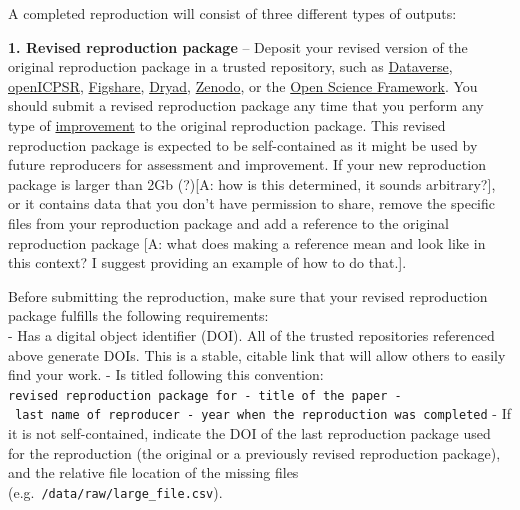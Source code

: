 \documentclass[
]{book}
\begin{document}
A completed reproduction will consist of three different types of outputs:

\textbf{1. Revised reproduction package} -- Deposit your revised version of the original reproduction package in a trusted repository, such as \href{https://dataverse.org/}{Dataverse}, \href{https://www.openicpsr.org/openicpsr/}{openICPSR}, \href{https://figshare.com}{Figshare}, \href{https://datadryad.org/stash}{Dryad}, \href{https://about.zenodo.org/}{Zenodo}, or the \href{osf.io/}{Open Science Framework}. You should submit a revised reproduction package any time that you perform any type of \protect\hyperlink{improvements}{improvement} to the original reproduction package. This revised reproduction package is expected to be self-contained as it might be used by future reproducers for assessment and improvement. If your new reproduction package is larger than 2Gb (?){[}A: how is this determined, it sounds arbitrary?{]}, or it contains data that you don't have permission to share, remove the specific files from your reproduction package and add a reference to the original reproduction package {[}A: what does making a reference mean and look like in this context? I suggest providing an example of how to do that.{]}.

Before submitting the reproduction, make sure that your revised reproduction package fulfills the following requirements:\\
- Has a digital object identifier (DOI). All of the trusted repositories referenced above generate DOIs. This is a stable, citable link that will allow others to easily find your work.
- Is titled following this convention: \texttt{revised\ reproduction\ package\ for\ -\ title\ of\ the\ paper\ -\ last\ name\ of\ reproducer\ -\ year\ when\ the\ reproduction\ was\ completed}
- If it is not self-contained, indicate the DOI of the last reproduction package used for the reproduction (the original or a previously revised reproduction package), and the relative file location of the missing files (e.g.~\texttt{/data/raw/large\_file.csv}).
\end{document}
